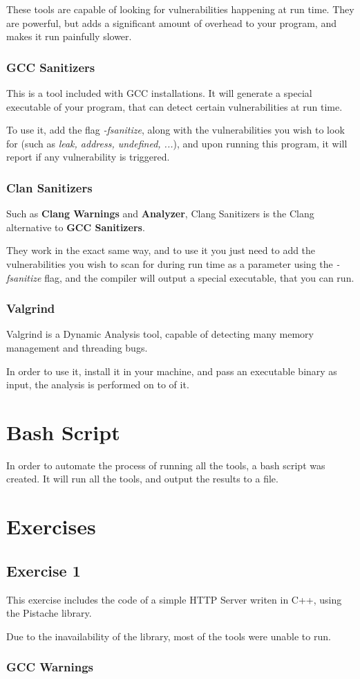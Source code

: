 \documentclass{article}
\begin{document}
These tools are capable of looking for vulnerabilities happening at run time. They are powerful, but adds a significant amount of overhead to your program, and makes it run painfully slower.

\subsubsection{GCC Sanitizers}

This is a tool included with GCC installations. It will generate a special executable of your program, that can detect certain vulnerabilities at run time.

To use it, add the flag \textit{-fsanitize}, along with the vulnerabilities you wish to look for (such as \textit{leak, address, undefined, ...}), and upon running this program, it will report if any vulnerability is triggered.

\subsubsection{Clan Sanitizers}

Such as \textbf{Clang Warnings} and \textbf{Analyzer}, Clang Sanitizers is the Clang alternative to \textbf{GCC Sanitizers}.

They work in the exact same way, and to use it you just need to add the vulnerabilities you wish to scan for during run time as a parameter using the \textit{-fsanitize} flag, and the compiler will output a special executable, that you can run.

\subsubsection{Valgrind}

Valgrind is a Dynamic Analysis tool, capable of detecting many memory management and threading bugs.

In order to use it, install it in your machine, and pass an executable binary as input, the analysis is performed on to of it.

\section{Bash Script}

In order to automate the process of running all the tools, a bash script was created. It will run all the tools, and output the results to a file.

\section{Exercises}

\subsection{Exercise 1}

This exercise includes the code of a simple HTTP Server writen in C++, using the Pistache library.

Due to the inavailability of the library, most of the tools were unable to run.

\subsubsection{GCC Warnings}
\end{document}
